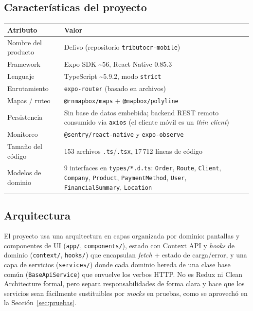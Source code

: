 \documentclass[11pt,a4paper]{article}
\begin{document}
\subsection{Características del proyecto}

\begin{longtable}{p{4.2cm} p{10.3cm}}
\toprule
\textbf{Atributo} & \textbf{Valor} \\
\midrule
\endhead
Nombre del producto & Delivo (repositorio \texttt{tributocr-mobile}) \\
Framework & Expo SDK \textasciitilde 56, React Native 0.85.3 \\
Lenguaje & TypeScript \textasciitilde 5.9.2, modo \texttt{strict} \\
Enrutamiento & \texttt{expo-router} (basado en archivos) \\
Mapas / ruteo & \texttt{@rnmapbox/maps} + \texttt{@mapbox/polyline} \\
Persistencia & Sin base de datos embebida; backend REST remoto consumido vía \texttt{axios} (el cliente móvil es un \emph{thin client}) \\
Monitoreo & \texttt{@sentry/react-native} y \texttt{expo-observe} \\
Tamaño del código & 153 archivos \texttt{.ts}/\texttt{.tsx}, 17\,712 líneas de código \\
Modelos de dominio & 9 interfaces en \texttt{types/*.d.ts}: \texttt{Order}, \texttt{Route}, \texttt{Client}, \texttt{Company}, \texttt{Product}, \texttt{PaymentMethod}, \texttt{User}, \texttt{FinancialSummary}, \texttt{Location} \\
\bottomrule
\end{longtable}

\subsection{Arquitectura}

El proyecto usa una arquitectura en capas organizada por dominio: pantallas y componentes
de UI (\texttt{app/}, \texttt{components/}), estado con Context API y \textit{hooks} de
dominio (\texttt{context/}, \texttt{hooks/}) que encapsulan \textit{fetch} + estado de
carga/error, y una capa de servicios (\texttt{services/}) donde cada dominio hereda de una
clase base común (\texttt{BaseApiService}) que envuelve los verbos HTTP. No es Redux ni
Clean Architecture formal, pero separa responsabilidades de forma clara y hace que los
servicios sean fácilmente sustituibles por \textit{mocks} en pruebas, como se aprovechó en
la Sección~\ref{sec:pruebas}.
\end{document}
